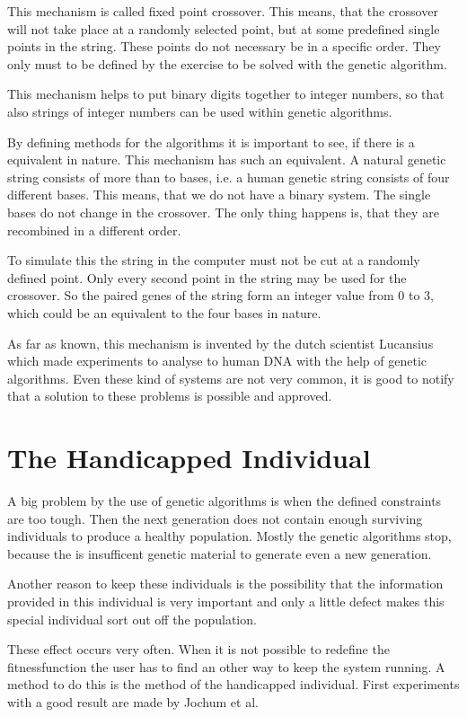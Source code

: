 This mechanism is called fixed point crossover. This means, that the crossover
will not take place at a randomly selected point, but at some predefined single
points in the string.
These points do not necessary be in a specific order. They only must to be defined
by the exercise to be solved with the genetic algorithm.

This mechanism helps to put binary digits together to integer numbers, so that
also strings of integer numbers can be used within genetic algorithms.

By defining methods for the algorithms it is important to see, if there is a
equivalent in nature. This mechanism has such an equivalent. A natural genetic
string consists of more than to bases, i.e. a human genetic string consists
of four different bases. This means, that we do not have a binary system. The
single bases do not change in the crossover. The only thing happens is, that they
are recombined in a different order.

To simulate this the string in the computer must not be cut at a randomly defined
point. Only every second point in the string may be used for the crossover. So
the paired genes of the string form an integer value from 0 to 3, which could
be an equivalent to the four bases in nature.

As far as known, this mechanism is invented by the dutch scientist Lucansius\cite{Luc91}
which made experiments to analyse to human DNA with the help of genetic algorithms.
Even these kind of systems are not very common, it is good to notify that a
solution to these problems is possible and approved.
\section{The Handicapped Individual}
A big problem by the use of genetic algorithms is when the defined constraints
are too tough. Then the next generation does not contain enough surviving individuals
to produce a healthy population. Mostly the genetic algorithms stop, because
the is insufficent genetic material to generate even a new generation.

Another reason to keep these individuals is the possibility that the information
provided in this individual is very important and only a little defect makes
this special individual sort out off the population.

These effect occurs very often. When it is not possible to redefine the fitnessfunction
the user has to find an other way to keep the system running. A method to do
this is the method of the handicapped individual\cite{Gri91b}. First experiments
with a good result are made by Jochum et al\cite{Joc91}.

